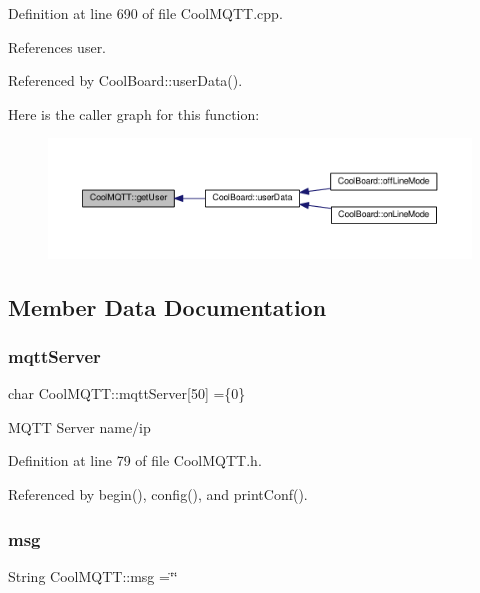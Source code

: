Definition at line 690 of file Cool\+M\+Q\+T\+T.\+cpp.



References user.



Referenced by Cool\+Board\+::user\+Data().

Here is the caller graph for this function\+:
\nopagebreak
\begin{figure}[H]
\begin{center}
\leavevmode
\includegraphics[width=350pt]{d0/dd0/class_cool_m_q_t_t_a373cc92fca7760d886f02d8a6e5b3f63_icgraph}
\end{center}
\end{figure}


\subsection{Member Data Documentation}
\mbox{\label{class_cool_m_q_t_t_ab8bb951f87ddbf92db74c2ad16a3e53e}} 
\subsubsection{\texorpdfstring{mqtt\+Server}{mqttServer}}
{\footnotesize\ttfamily char Cool\+M\+Q\+T\+T\+::mqtt\+Server\mbox{[}50\mbox{]} =\{\textquotesingle{}0\textquotesingle{}\}\hspace{0.3cm}{\ttfamily [private]}}

M\+Q\+TT Server name/ip 

Definition at line 79 of file Cool\+M\+Q\+T\+T.\+h.



Referenced by begin(), config(), and print\+Conf().

\mbox{\label{class_cool_m_q_t_t_af6b19e7074dbbb4ae493c44dcb53f7ff}} 
\subsubsection{\texorpdfstring{msg}{msg}}
{\footnotesize\ttfamily String Cool\+M\+Q\+T\+T\+::msg =\char`\"{}\char`\"{}\hspace{0.3cm}{\ttfamily [private]}}

